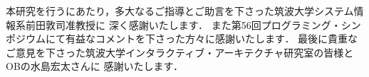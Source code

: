 \documentclass[a4paper,11pt,dvipdfmx]{jreport}
\makeatletter
\renewenvironment{thebibliography}[1]%
{\chapter*{\bibname\@mkboth{\bibname}{\bibname}}%
	\addcontentsline{toc}{chapter}{\numberline{}\bibname}%
	\list{\@biblabel{\@arabic\c@enumiv}}%
	{\settowidth\labelwidth{\@biblabel{#1}}%
		\leftmargin\labelwidth
		\advance\leftmargin\labelsep
		\@openbib@code
		\usecounter{enumiv}%
		\let\p@enumiv\@empty
		\renewcommand\theenumiv{\@arabic\c@enumiv}}%
	\sloppy
	\clubpenalty4000
	\@clubpenalty\clubpenalty
	\widowpenalty4000%
	\sfcode`\.\@m}
{\def\@noitemerr
	{\@latex@warning{Empty `thebibliography' environment}}%
	\endlist}
\makeatother
\begin{document}
本研究を行うにあたり，多大なるご指導とご助言を下さった筑波大学システム情報系前田敦司准教授に
深く感謝いたします．
また第56回プログラミング・シンポジウムにて有益なコメントを下さった方々に感謝いたします．
最後に貴重なご意見を下さった筑波大学インタラクティブ・アーキテクチャ研究室の皆様とOBの水島宏太さんに
感謝いたします．

\newpage

\renewcommand{\bibname}{参考文献}




%
%
\end{document}
